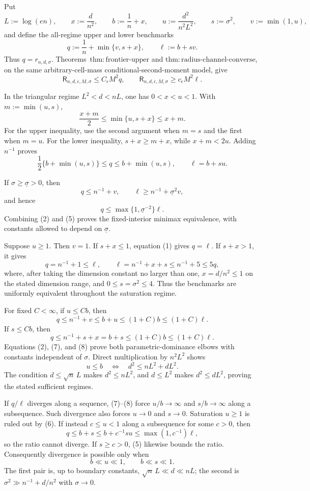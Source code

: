 Put
\[
 L:=\log(en),\qquad x:=\frac d{n^2},\qquad
 b:=\frac1n+x,\qquad u:=\frac{d^2}{n^2L^2},
 \qquad s:=\sigma^2,\qquad v:=\min(1,u),
\]
and define the all-regime upper and lower benchmarks
\[
 q:=\frac1n+\min\{v,s+x\},\qquad \ell:=b+sv.
\tag{1}
\]
Thus \(q=r_{n,d,\sigma}\).  Theorems~\(\mathrm{thm:frontier\text{-}upper}\) and \(\mathrm{thm:radius\text{-}channel\text{-}converse}\), on the same arbitrary-cell-mass conditional-second-moment model, give
\[
 \mathsf R_{n,d,\epsilon,M,\sigma}\le C_\epsilon M^2q,
 \qquad
 \mathsf R_{n,d,\epsilon,M,\sigma}\ge c_\epsilon M^2\ell.
\tag{2}
\]

In the triangular regime \(L^2<d<nL\), one has \(0<x<u<1\).  With \(m:=\min(u,s)\),
\[
 \frac{x+m}{2}\le\min\{u,s+x\}\le x+m.
\tag{3}
\]
For the upper inequality, use the second argument when \(m=s\) and the first when \(m=u\).  For the lower inequality, \(s+x\ge m+x\), while \(x+m<2u\).  Adding \(n^{-1}\) proves
\[
 \frac12\{b+\min(u,s)\}\le q\le b+\min(u,s),
 \qquad \ell=b+su.
\tag{4}
\]

If \(\sigma\ge\underline\sigma>0\), then
\[
 q\le n^{-1}+v,\qquad
 \ell\ge n^{-1}+\underline\sigma^2v,
\]
and hence
\[
 q\le\max\{1,\underline\sigma^{-2}\}\ell.
\tag{5}
\]
Combining (2) and (5) proves the fixed-interior minimax equivalence, with constants allowed to depend on \(\underline\sigma\).

Suppose \(u\ge1\).  Then \(v=1\).  If \(s+x\le1\), equation (1) gives \(q=\ell\).  If \(s+x>1\), it gives
\[
 q=n^{-1}+1\le\ell,
 \qquad
 \ell=n^{-1}+x+s\le n^{-1}+5\le5q,
\tag{6}
\]
where, after taking the dimension constant no larger than one, \(x=d/n^2\le1\) on the stated dimension range, and \(0\le s=\sigma^2\le4\).  Thus the benchmarks are uniformly equivalent throughout the saturation regime.

For fixed \(C<\infty\), if \(u\le Cb\), then
\[
 q\le n^{-1}+v\le b+u\le(1+C)b\le(1+C)\ell.
\tag{7}
\]
If \(s\le Cb\), then
\[
 q\le n^{-1}+s+x=b+s\le(1+C)b\le(1+C)\ell.
\tag{8}
\]
Equations (2), (7), and (8) prove both parametric-dominance elbows with constants independent of \(\sigma\).  Direct multiplication by \(n^2L^2\) shows
\[
 u\le b\quad\Longleftrightarrow\quad d^2\le nL^2+dL^2.
\tag{9}
\]
The condition \(d\le\sqrt n\,L\) makes \(d^2\le nL^2\), and \(d\le L^2\) makes \(d^2\le dL^2\), proving the stated sufficient regimes.

If \(q/\ell\) diverges along a sequence, (7)--(8) force \(u/b\to\infty\) and \(s/b\to\infty\) along a subsequence.  Such divergence also forces \(u\to0\) and \(s\to0\).  Saturation \(u\ge1\) is ruled out by (6).  If instead \(c\le u<1\) along a subsequence for some \(c>0\), then
\[
 q\le b+s\le b+c^{-1}su\le\max(1,c^{-1})\ell,
\]
so the ratio cannot diverge.  If \(s\ge c>0\), (5) likewise bounds the ratio.  Consequently divergence is possible only when
\[
 b\ll u\ll1,
 \qquad
 b\ll s\ll1.
\tag{10}
\]
The first pair is, up to boundary constants, \(\sqrt n\,L\ll d\ll nL\); the second is \(\sigma^2\gg n^{-1}+d/n^2\) with \(\sigma\to0\).

